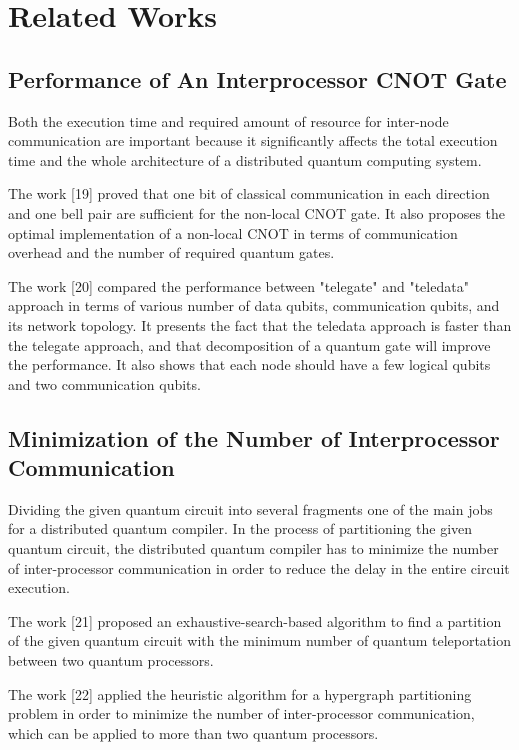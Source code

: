 \chapter{Related Works}
\label{related works}

\section{Performance of  An Interprocessor CNOT Gate}
Both the execution time and required amount of resource for inter-node communication are important because it significantly affects the total execution time and the whole architecture of a distributed quantum computing system. 

 The work [19] proved that one bit of classical communication in each direction and one bell pair are sufficient for the non-local CNOT gate.  It also proposes the optimal implementation of a non-local CNOT in terms of communication overhead and the number of required quantum gates. 
 
 The work [20] compared the performance between "telegate" and "teledata" approach in terms of various number of data qubits, communication qubits, and its network topology.  It presents the fact that the teledata approach is faster than the telegate approach, and that decomposition of a quantum gate will improve the performance.  It also shows that each node should have a few logical qubits and two communication qubits.

\section{Minimization of the Number of Interprocessor Communication}

Dividing the given quantum circuit into several fragments one of the main jobs for a distributed quantum compiler.  In the process of partitioning the given quantum circuit, the distributed quantum compiler has to minimize the number of inter-processor communication in order to reduce the delay in the entire circuit execution.  

The work [21] proposed an exhaustive-search-based algorithm to find a partition of the given quantum circuit with the minimum number of quantum teleportation between two quantum processors.

The work [22] applied the heuristic algorithm for a hypergraph partitioning problem in order to minimize the number of inter-processor communication, which can be applied to more than two quantum processors.

